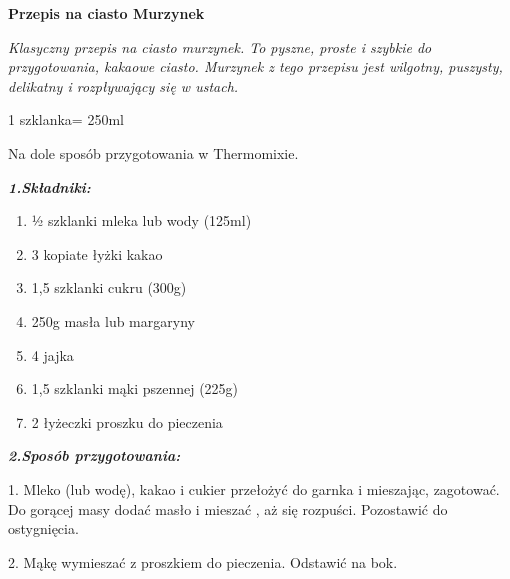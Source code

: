 \documentclass[12pt, letterpaper, titlepage]{article}
\begin{document}
\begin{Huge}
\begin{center}
\textbf{Przepis na ciasto Murzynek}
\end{center}
\fontsize{16}{15}\selectfont \textit {Klasyczny przepis na ciasto murzynek. To pyszne, proste i szybkie do przygotowania, kakaowe ciasto. Murzynek z tego przepisu jest wilgotny, puszysty, delikatny i rozpływający się w ustach.}


\begin{flushleft}

1 szklanka= 250ml
\end{flushleft}

\begin{flushleft}
Na dole sposób przygotowania w Thermomixie.
\end{flushleft}

\begin{flushleft}

\end{flushleft}


\begin{flushleft}
\textbf{\textit{1.Składniki:}}
\end{flushleft}

\begin{enumerate}[*]
\item ½ szklanki mleka lub wody (125ml)
\item 3 kopiate łyżki kakao
\item 1,5 szklanki cukru (300g)
\item 250g masła lub margaryny
\item 4 jajka
\item 1,5 szklanki mąki pszennej (225g)
\item 2 łyżeczki proszku do pieczenia
\end{enumerate}

\begin{flushleft}

\end{flushleft}

\begin{flushleft}
\textbf{\textit{2.Sposób przygotowania:}}
\end{flushleft}


\begin{flushleft}
1. Mleko (lub wodę), kakao i cukier przełożyć do garnka i mieszając, zagotować. Do gorącej masy dodać masło i mieszać , aż się rozpuści. Pozostawić do ostygnięcia.
\end{flushleft}
\begin{flushleft}
2. Mąkę wymieszać z proszkiem do pieczenia. Odstawić na bok.
\end{flushleft}


\end{Huge}
\end{document}
